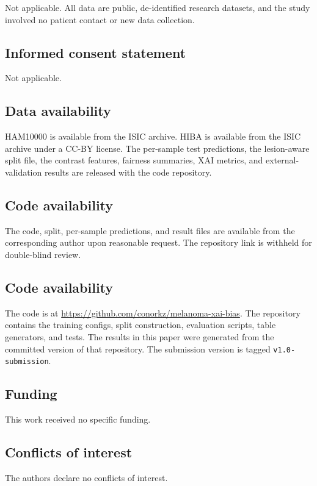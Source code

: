Not applicable. All data are public, de-identified research datasets, and the study involved no patient contact or new data collection.

\subsection*{Informed consent statement}

Not applicable.

\subsection*{Data availability}

HAM10000 is available from the ISIC archive. HIBA is available from the ISIC archive under a CC-BY license. The per-sample test predictions, the lesion-aware split file, the contrast features, fairness summaries, XAI metrics, and external-validation results are released with the code repository.

\ifdefined\blindmode
\subsection*{Code availability}

The code, split, per-sample predictions, and result files are available from the corresponding author upon reasonable request. The repository link is withheld for double-blind review.
\else
\subsection*{Code availability}

The code is at \url{https://github.com/conorkz/melanoma-xai-bias}. The repository contains the training configs, split construction, evaluation scripts, table generators, and tests. The results in this paper were generated from the committed version of that repository. The submission version is tagged \texttt{v1.0-submission}.
\fi

\subsection*{Funding}

This work received no specific funding.

\subsection*{Conflicts of interest}

The authors declare no conflicts of interest.
